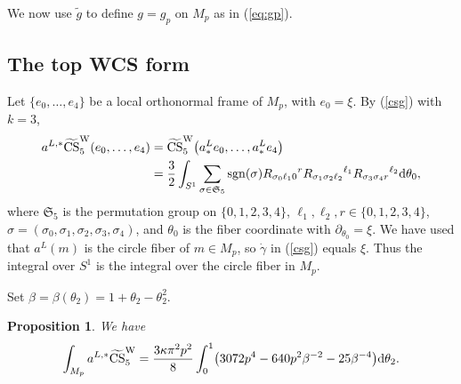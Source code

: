 \documentclass[10pt,a4paper]{amsart}
\numberwithin{equation}{section}
\newtheorem{Proposition}[Theorem]{Proposition}
\theoremstyle{definition}
\newcommand{\bxi}{\xi}
\newcommand{\sgn}{{\rm sgn}}
\newcommand{\omp}{M_p}
\newcommand{\tg}{\tilde g}
\newcommand{\barcurvature}[2]{R_{#1}{}^{#2}}
\begin{document}
We now use $\tg$ to define $g = g_p$ on $M_p$ as in (\ref{eq:gp}).

\subsection{The top WCS form}%

Let $\{e_0,\dots,e_4\}$ be a local orthonormal frame of $M_p$, with $e_0 = \bxi$.
By (\ref{csg}) with $k=3$,
\begin{align}
a^{L,*}\widetilde{{\rm CS}}^{\rm W}_5(e_0,\dots,e_4) &= \widetilde{{\rm CS}}^{\rm W}_5 \bigl(a^L_*e_0,\dots, a^L_* e_4\bigr)\nonumber\\
&=\frac{3}{2}\int_{S^1}
\sum_{\sigma \in {\mathfrak S_5}}
\sgn(\sigma) \barcurvature{\sigma_0 \ell_1 0}{r}
\barcurvature{\sigma_1 \sigma_2 \ell_2}{\ell_1}
\barcurvature{\sigma_3\sigma_4 r}{\ell_2}{\rm d}\theta_0,\label{CSThurston}
\end{align}
where $\mathfrak S_5$ is the permutation group on $\{0,1,2,3,4\}$, $\ell_1, \ell_2, r\in \{0,1,2,3,4\}$,
$\sigma=(\sigma_0, \sigma_1, \sigma_2,\allowbreak \sigma_3,\sigma_4)$, and $\theta_0$ is the fiber coordinate with $\partial_{\theta_0} = \bxi$. We have used that $a^L(m)$ is the circle fiber of $m\in \omp$, so $\dot\gamma$ in (\ref{csg}) equals $\bxi$. Thus
the integral over $S^1$ is the integral over the circle fiber in $\omp$.

Set $\beta = \beta(\theta_2) = 1+ \theta_2-\theta_2^2$.

\begin{Proposition}\label{Thurston theorem}
We have
\begin{equation}\label{thm:thurston}
\int_{\omp}
a^{L,*}\widetilde{{\rm CS}}^{\rm W}_5=
\frac{3\kappa\pi^2 p^{2}}{8}
\int_0^1\bigl(3072p^4 -640p^2\beta^{-2} -25\beta^{-4}\bigr){\rm d}\theta_2.
\end{equation}
\end{Proposition}
\end{document}
